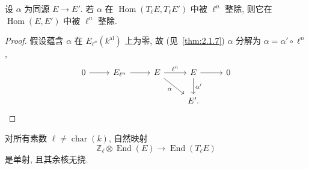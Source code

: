 \begin{lemma} \label{thm:2.6.6} 
设 $\alpha$ 为同源 $E\to E'$. 若 $\alpha$ 在 $\operatorname{Hom}(T_\ell E, T_\ell E')$ 中被 $\ell^n$ 整除, 则它在 $\operatorname{Hom}(E, E')$ 中被 $\ell^n$ 整除.
\end{lemma}

\begin{proof}
假设蕴含 $\alpha$ 在 $E_{\ell^n}(k^{\mathrm{al}})$ 上为零, 故 (见~\ref{thm:2.1.7}) $\alpha$ 分解为 $\alpha = \alpha'\circ\ell^n$,
\[\begin{tikzcd}
	0 & {E_{\ell^n}} & E & E & 0 \\
	&&& {E'.}
	\arrow[from=1-1, to=1-2]
	\arrow[from=1-2, to=1-3]
	\arrow["{\ell^n}", from=1-3, to=1-4]
	\arrow["\alpha"', from=1-3, to=2-4]
	\arrow[from=1-4, to=1-5]
	\arrow["{\alpha'}", from=1-4, to=2-4]
\end{tikzcd}\]
\end{proof}

\begin{proposition} \label{thm:2.6.7} 
对所有素数 $\ell\neq\operatorname{char}(k)$, 自然映射
\[
\mathbb{Z}_\ell\otimes\operatorname{End}(E)\to\operatorname{End}(T_\ell E)
\]
是单射, 且其余核无挠.
\end{proposition}

